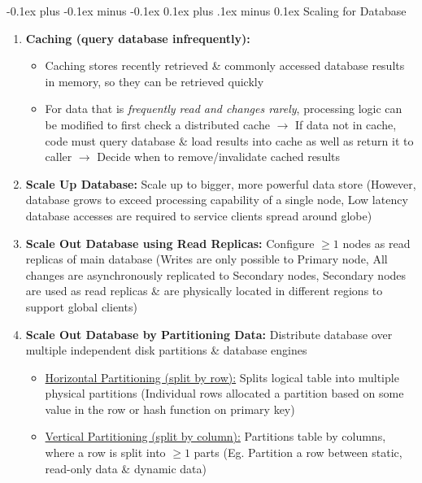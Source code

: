 \documentclass[landscape]{article}
\makeatletter
\renewcommand{\subsection}{\@startsection{subsection}{2}{0mm}%
  {-0.1ex plus -0.1ex minus -0.1ex}%
  {0.1ex plus .1ex minus 0.1ex}%
{\normalfont\scriptsize\bfseries}}
\makeatother
\begin{document}
\begin{multicols*}{5}
    \subsection{Scaling for Database}
    \begin{enumerate}
      \item \textbf{Caching (query database infrequently):}
      \begin{itemize}
        \item Caching stores recently retrieved \& commonly accessed database results in memory, so they can be retrieved quickly
        \item For data that is \textit{frequently read and changes rarely}, processing logic can be modified to first check a distributed cache $\rightarrow$ If data not in cache, code must query database \& load results into cache as well as return it to caller $\rightarrow$ Decide when to remove/invalidate cached results
      \end{itemize}
      \item \textbf{Scale Up Database:} Scale up to bigger, more powerful data store (However, database grows to exceed processing capability of a single node, Low latency database accesses are required to service clients spread around globe)
      \item \textbf{Scale Out Database using Read Replicas:} Configure $\geq 1$ nodes as read replicas of main database (Writes are only possible to Primary node, All changes are asynchronously replicated to Secondary nodes, Secondary nodes are used as read replicas \& are physically located in different regions to support global clients)
      \item \textbf{Scale Out Database by Partitioning Data:} Distribute database over multiple independent disk partitions \& database engines
      \begin{itemize}
        \item \underline{Horizontal Partitioning (split by row):} Splits logical table into multiple physical partitions (Individual rows allocated a partition based on some value in the row or hash function on primary key)
        \item \underline{Vertical Partitioning (split by column):} Partitions table by columns, where a row is split into $\geq 1$ parts (Eg. Partition a row between static, read-only data \& dynamic data)
      \end{itemize}
    \end{enumerate}


\end{multicols*}
\end{document}
